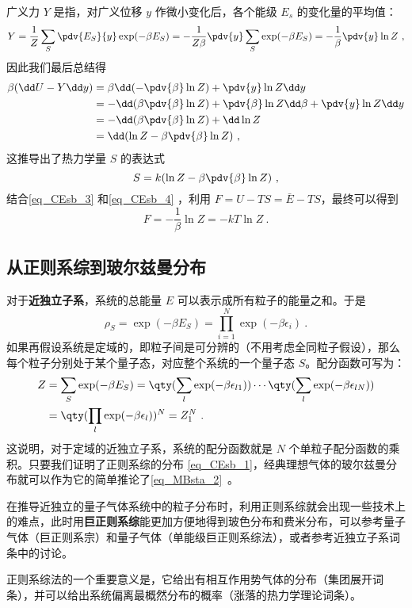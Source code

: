 广义力 $Y$ 是指，对广义位移 $y$ 作微小变化后，各个能级 $E_s$ 的变化量的平均值：
\begin{equation}
Y=\frac{1}{Z} \sum_S \pdv{E_S}{y} \exp(-\beta E_S)=-\frac{1}{Z\beta}\pdv{y} \sum_S\exp(-\beta E_S)=-\frac{1}{\beta} \pdv{y} \ln Z~,
\end{equation}
因此我们最后总结得
\begin{equation}
\begin{aligned}
\beta(\dd U-Y\dd y)&=\beta \dd (-\pdv{\beta} \ln Z)+\pdv{y} \ln Z\dd y\\
&= -\dd(\beta\pdv{\beta} \ln Z)+\pdv{\beta}\ln Z\dd \beta +\pdv{y} \ln Z\dd y\\
&= -\dd(\beta\pdv{\beta} \ln Z)+\dd \ln Z\\
&=\dd (\ln Z-\beta\pdv{\beta} \ln Z)~,
\end{aligned}
\end{equation}
这推导出了热力学量 $S$ 的表达式
\begin{equation}\label{eq_CEsb_4}
S=k(\ln Z-\beta\pdv{\beta}\ln Z)~,
\end{equation}
结合\autoref{eq_CEsb_3} 和\autoref{eq_CEsb_4} ，利用 $F=U-TS=\bar E-TS$，最终可以得到
\begin{equation}
F=-\frac{1}{\beta}\ln Z=-kT\ln Z~.
\end{equation}



\subsection{从正则系综到玻尔兹曼分布}
对于\textbf{近独立子系}，系统的总能量 $E$ 可以表示成所有粒子的能量之和。于是
\begin{equation}
\rho_S=\exp(-\beta E_S)=\prod_{i=1}^N\exp(-\beta\epsilon_i)~.
\end{equation}
如果再假设系统是定域的，即粒子间是可分辨的（不用考虑全同粒子假设），那么每个粒子分别处于某个量子态，对应整个系统的一个量子态 $S$。配分函数可写为：
\begin{equation}
\begin{aligned}
Z&=\sum_S\exp(-\beta E_S)=\qty(\sum_{l}\exp(-\beta\epsilon_{l1}))\cdots\qty(\sum_{l}\exp(-\beta\epsilon_{lN}))\\
&=\qty(\prod_{l}\exp(-\beta\epsilon_{l}))^N=Z_1^N~.
\end{aligned}
\end{equation}
这说明，对于定域的近独立子系，系统的配分函数就是 $N$ 个单粒子配分函数的乘积。只要我们证明了正则系综的分布 \autoref{eq_CEsb_1}，经典理想气体的玻尔兹曼分布就可以作为它的简单推论了\autoref{eq_MBsta_2}~。

在推导近独立的量子气体系统中的粒子分布时，利用正则系综就会出现一些技术上的难点，此时用\textbf{巨正则系综}能更加方便地得到玻色分布和费米分布，可以参考量子气体（巨正则系宗）和量子气体（单能级巨正则系综法），或者参考近独立子系词条中的讨论。

正则系综法的一个重要意义是，它给出有相互作用势气体的分布（集团展开词条），并可以给出系统偏离最概然分布的概率（涨落的热力学理论词条）。
